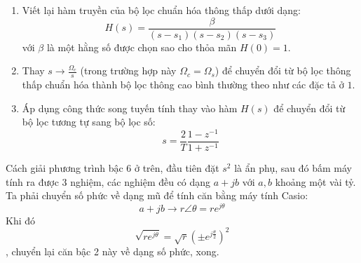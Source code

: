\documentclass{article}
\begin{document}
\begin{enumerate}
  \item Viết lại hàm truyền của bộ lọc chuẩn hóa thông thấp dưới dạng:
  $$H(s)=\frac{\beta}{(s-s_{1})(s-s_{2})(s-s_{3})}$$
với $\beta$ là một hằng số được chọn sao cho thỏa mãn $H(0)=1$.
  \item Thay $s\to \frac{\Omega_{c}}{s}$ (trong trường hợp này $\Omega_{c}=\Omega_{s}$) để chuyển đổi từ bộ lọc thông thấp chuẩn hóa thành bộ lọc thông cao bình thường theo như các đặc tả ở $1$.
  \item Áp dụng công thức song tuyến tính thay vào hàm $H(s)$ để chuyển đổi từ bộ lọc tương tự sang bộ lọc số: $$s=\frac{2}{T}\frac{1-z^{-1}}{1+z^{-1}}$$
\end{enumerate}
Cách giải phương trình bậc $6$ ở trên, đầu tiên đặt $s^2$ là ẩn phụ, sau đó bấm máy tính ra được $3$ nghiệm, các nghiệm đều có dạng $a+jb$ với $a,b$ khoảng một vài tỷ. Ta phải chuyển số phức về dạng mũ để tính căn bằng máy tính Casio:
$$a+jb\to r\angle \theta=re^{j\theta}$$
Khi đó $$\sqrt{re^{j\theta}}=\sqrt{r}(\pm e^{j\frac{\theta}{2}})^2$$, chuyển lại căn bậc 2 này về dạng số phức, xong.
\end{document}
